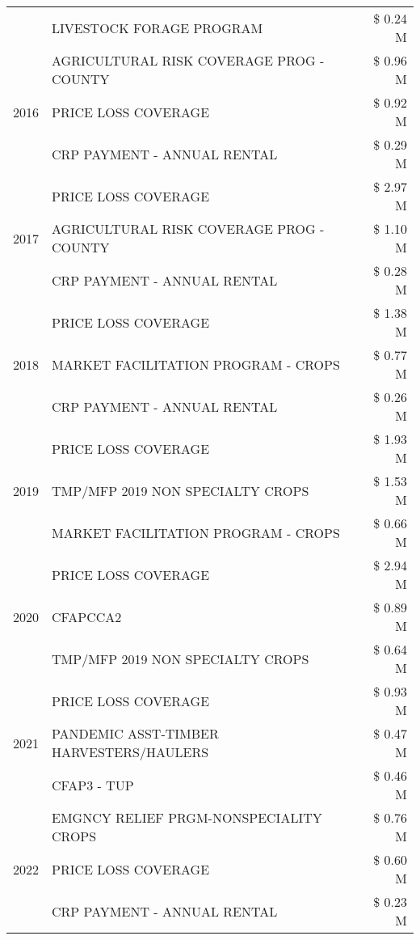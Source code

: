\begin{tabular}{llr}
 & LIVESTOCK FORAGE PROGRAM & \$ 0.24 M \\
\cline{1-3}
\multirow[t]{3}{*}{2016} & AGRICULTURAL RISK COVERAGE PROG - COUNTY & \$ 0.96 M \\
 & PRICE LOSS COVERAGE & \$ 0.92 M \\
 & CRP PAYMENT - ANNUAL RENTAL & \$ 0.29 M \\
\cline{1-3}
\multirow[t]{3}{*}{2017} & PRICE LOSS COVERAGE & \$ 2.97 M \\
 & AGRICULTURAL RISK COVERAGE PROG - COUNTY & \$ 1.10 M \\
 & CRP PAYMENT - ANNUAL RENTAL & \$ 0.28 M \\
\cline{1-3}
\multirow[t]{3}{*}{2018} & PRICE LOSS COVERAGE & \$ 1.38 M \\
 & MARKET FACILITATION PROGRAM - CROPS & \$ 0.77 M \\
 & CRP PAYMENT - ANNUAL RENTAL & \$ 0.26 M \\
\cline{1-3}
\multirow[t]{3}{*}{2019} & PRICE LOSS COVERAGE & \$ 1.93 M \\
 & TMP/MFP 2019 NON SPECIALTY CROPS & \$ 1.53 M \\
 & MARKET FACILITATION PROGRAM - CROPS & \$ 0.66 M \\
\cline{1-3}
\multirow[t]{3}{*}{2020} & PRICE LOSS COVERAGE & \$ 2.94 M \\
 & CFAPCCA2 & \$ 0.89 M \\
 & TMP/MFP 2019 NON SPECIALTY CROPS & \$ 0.64 M \\
\cline{1-3}
\multirow[t]{3}{*}{2021} & PRICE LOSS COVERAGE & \$ 0.93 M \\
 & PANDEMIC ASST-TIMBER HARVESTERS/HAULERS & \$ 0.47 M \\
 & CFAP3 - TUP & \$ 0.46 M \\
\cline{1-3}
\multirow[t]{3}{*}{2022} & EMGNCY RELIEF PRGM-NONSPECIALITY CROPS & \$ 0.76 M \\
 & PRICE LOSS COVERAGE & \$ 0.60 M \\
 & CRP PAYMENT - ANNUAL RENTAL & \$ 0.23 M \\
\cline{1-3}
\bottomrule
\end{tabular}
